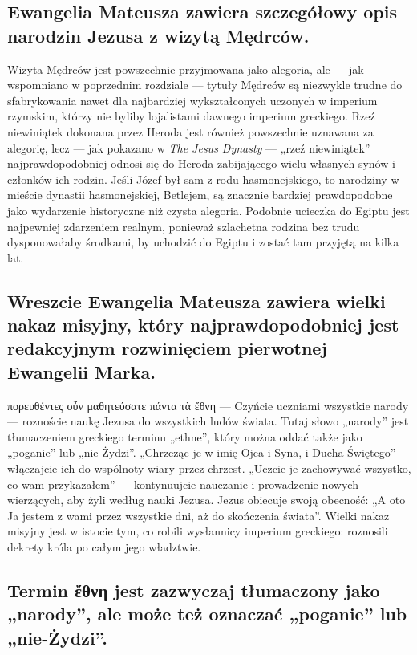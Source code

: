 \subsection{Ewangelia Mateusza zawiera szczegółowy opis narodzin Jezusa z wizytą Mędrców.}\label{subsec:the-gospel-of-matthew-includes-the-details-of-the-birth-of-jesus-with-the-visit-of-the-magi.}

Wizyta Mędrców jest powszechnie przyjmowana jako alegoria, ale — jak wspomniano w poprzednim rozdziale — tytuły Mędrców są niezwykle trudne do sfabrykowania nawet dla najbardziej wykształconych uczonych w imperium rzymskim, którzy nie byliby lojalistami dawnego imperium greckiego.
Rzeź niewiniątek dokonana przez Heroda jest również powszechnie uznawana za alegorię, lecz — jak pokazano w \emph{The Jesus Dynasty} — „rzeź niewiniątek” najprawdopodobniej odnosi się do Heroda zabijającego wielu własnych synów i członków ich rodzin.
Jeśli Józef był sam z rodu hasmonejskiego, to narodziny w mieście dynastii hasmonejskiej, Betlejem, są znacznie bardziej prawdopodobne jako wydarzenie historyczne niż czysta alegoria.
Podobnie ucieczka do Egiptu jest najpewniej zdarzeniem realnym, ponieważ szlachetna rodzina bez trudu dysponowałaby środkami, by uchodzić do Egiptu i zostać tam przyjętą na kilka lat.

\subsection{Wreszcie Ewangelia Mateusza zawiera wielki nakaz misyjny, który najprawdopodobniej jest redakcyjnym rozwinięciem pierwotnej Ewangelii Marka.}\label{subsec:finally-the-gospel-of-matthew-includes-the-great-commission-which-is-likely-an-edit-to-the-original-gospel-of-mark.}

πορευθέντες οὖν μαθητεύσατε πάντα τὰ ἔθνη — Czyńcie uczniami wszystkie narody — roznoście naukę Jezusa do wszystkich ludów świata.
Tutaj słowo „narody” jest tłumaczeniem greckiego terminu „ethne”, który można oddać także jako „poganie” lub „nie-Żydzi”.
„Chrzcząc je w imię Ojca i Syna, i Ducha Świętego” — włączajcie ich do wspólnoty wiary przez chrzest.
„Uczcie je zachowywać wszystko, co wam przykazałem” — kontynuujcie nauczanie i prowadzenie nowych wierzących, aby żyli według nauki Jezusa.
Jezus obiecuje swoją obecność: „A oto Ja jestem z wami przez wszystkie dni, aż do skończenia świata”.
Wielki nakaz misyjny jest w istocie tym, co robili wysłannicy imperium greckiego: roznosili dekrety króla po całym jego władztwie.

\subsection{Termin ἔθνη jest zazwyczaj tłumaczony jako „narody”, ale może też oznaczać „poganie” lub „nie-Żydzi”.}\label{subsec:the-term-ux1f14ux3b8ux3bdux3b7-is-typically-translated-as-nations-but-can-also-be-translated-as-gentiles-or-non-jews.}

